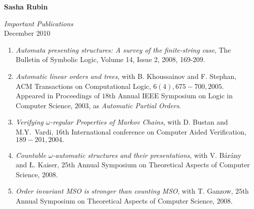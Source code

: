\documentclass[a4paper]{article}
\begin{document}
\begin{center}
{\Huge \bf Sasha Rubin}
\end{center}

\begin{center}
{\huge \it Important Publications} \\
\vspace{1em}
{\large December 2010}
\end {center}


\begin{enumerate}
\item 
{\it Automata presenting structures: A survey of the finite-string case}, The Bulletin of Symbolic Logic, 
Volume 14, Issue 2, 2008, 169-209.\\

\item 
{\it Automatic linear orders and trees}, with B. Khoussainov and F. Stephan, 
ACM Transactions on Computational Logic,
$6 (4), 675-700, 2005$. Appeared in 
Proceedings of $18$th Annual IEEE Symposium on Logic in Computer Science, $2003$,
as {\it Automatic Partial Orders}.  \\


\item 
{\it Verifying $\omega$-regular Properties of Markov Chains}, with D. Bustan and
M.Y.~Vardi, $16$th International conference on Computer Aided Verification,
$189-201, 2004.$ \\

\item {\it Countable $\omega$-automatic structures and their presentations}, with V.  B{\'a}r{\'a}ny and \L. Kaiser, 
$25$th Annual Symposium on Theoretical Aspects of Computer Science, $2008$.  \\

\item {\it Order invariant MSO is stronger than counting MSO}, with T. Ganzow, 
$25$th Annual Symposium on Theoretical Aspects of Computer Science, $2008$.  \\


\end{enumerate}
\end{document}
